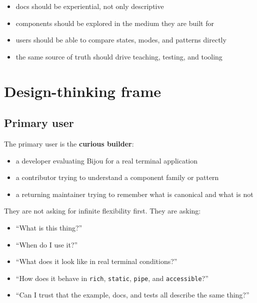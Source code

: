 \begin{itemize}
\tightlist
\item
  docs should be experiential, not only descriptive
\item
  components should be explored in the medium they are built for
\item
  users should be able to compare states, modes, and patterns directly
\item
  the same source of truth should drive teaching, testing, and tooling
\end{itemize}

\section{Design-thinking frame}\label{record-042-design-thinking-frame}

\subsection{Primary user}\label{record-042-primary-user}

The primary user is the \textbf{curious builder}:

\begin{itemize}
\tightlist
\item
  a developer evaluating Bijou for a real terminal application
\item
  a contributor trying to understand a component family or pattern
\item
  a returning maintainer trying to remember what is canonical and what is not
\end{itemize}

They are not asking for infinite flexibility first. They are asking:

\begin{itemize}
\tightlist
\item
  ``What is this thing?''
\item
  ``When do I use it?''
\item
  ``What does it look like in real terminal conditions?''
\item
  ``How does it behave in \texttt{r\allowbreak{}i\allowbreak{}c\allowbreak{}h}, \texttt{s\allowbreak{}t\allowbreak{}a\allowbreak{}t\allowbreak{}i\allowbreak{}c}, \texttt{p\allowbreak{}i\allowbreak{}p\allowbreak{}e}, and \texttt{a\allowbreak{}c\allowbreak{}c\allowbreak{}e\allowbreak{}s\allowbreak{}s\allowbreak{}i\allowbreak{}b\allowbreak{}l\allowbreak{}e}?''
\item
  ``Can I trust that the example, docs, and tests all describe the same thing?''
\end{itemize}


